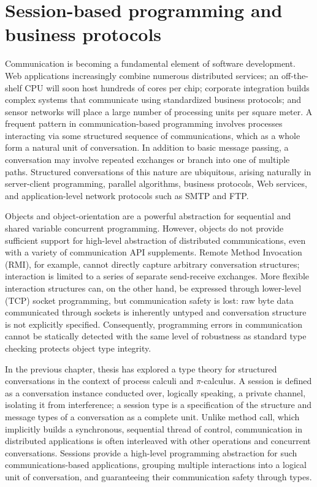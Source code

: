 \chapter{Session-based programming and business protocols}
\label{chap:session-based-programming}

Communication is becoming a fundamental element of software development. Web applications increasingly combine numerous distributed services; an off-the-shelf CPU will soon host hundreds of cores per chip; corporate integration builds complex systems that communicate using standardized business protocols; and sensor networks will place a large number of processing units per square meter. A frequent pattern in communication-based programming involves processes interacting via some structured sequence of communications, which as a whole form a natural unit of conversation. In addition to basic message passing, a conversation may involve repeated exchanges or branch into one of multiple paths. Structured conversations of this nature are ubiquitous, arising naturally in server-client programming, parallel algorithms, business protocols, Web services, and application-level network protocols such as SMTP and FTP.

Objects and object-orientation are a powerful abstraction for sequential and shared variable concurrent programming. However, objects do not provide sufficient support for high-level abstraction of distributed communications, even with a variety of communication API supplements. Remote Method Invocation (RMI), for example, cannot directly capture arbitrary conversation structures; interaction is limited to a series of separate send-receive exchanges. More flexible interaction structures can, on the other hand, be expressed through lower-level (TCP) socket programming, but communication safety is lost: raw byte data communicated through sockets is inherently untyped and conversation structure is not explicitly specified. Consequently, programming errors in communication cannot be statically detected with the same level of robustness as standard type checking protects object type integrity.

In the previous chapter, thesis has explored a type theory for structured conversations in the context of process calculi and $\pi$-calculus. A session is defined as a conversation instance conducted over, logically speaking, a private channel, isolating it from interference; a session type is a specification of the structure and message types of a conversation as a complete unit. Unlike method call, which implicitly builds a synchronous, sequential thread of control, communication in distributed applications is often interleaved with other operations and concurrent conversations. Sessions provide a high-level programming abstraction for such communications-based applications, grouping multiple interactions into a logical unit of conversation, and guaranteeing their communication safety through types.

